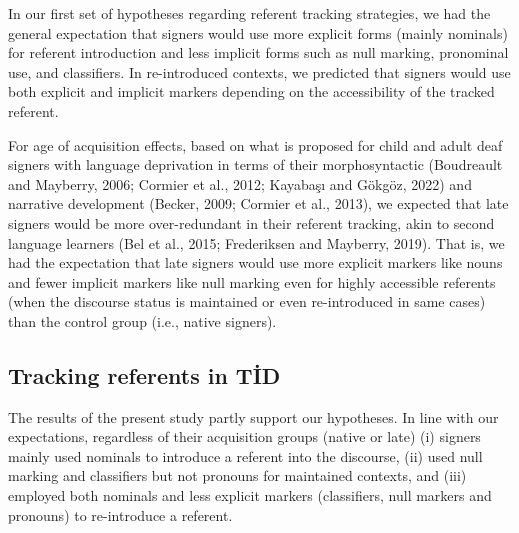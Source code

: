 \documentclass[]{elsarticle} %
\begin{document}
In our first set of hypotheses regarding referent tracking strategies,
we had the general expectation that signers would use more explicit
forms (mainly nominals) for referent introduction and less implicit
forms such as null marking, pronominal use, and classifiers. In
re-introduced contexts, we predicted that signers would use both
explicit and implicit markers depending on the accessibility of the
tracked referent.

For age of acquisition effects, based on what is proposed for child and
adult deaf signers with language deprivation in terms of their
morphosyntactic (Boudreault and Mayberry, 2006; Cormier et al., 2012;
Kayabaşı and Gökgöz, 2022) and narrative development (Becker, 2009;
Cormier et al., 2013), we expected that late signers would be more
over-redundant in their referent tracking, akin to second language
learners (Bel et al., 2015; Frederiksen and Mayberry, 2019). That is, we
had the expectation that late signers would use more explicit markers
like nouns and fewer implicit markers like null marking even for highly
accessible referents (when the discourse status is maintained or even
re-introduced in same cases) than the control group (i.e., native
signers).

\hypertarget{tracking-referents-in-tid}{%
\subsection{Tracking referents in TİD}\label{tracking-referents-in-tid}}

The results of the present study partly support our hypotheses. In line
with our expectations, regardless of their acquisition groups (native or
late) (i) signers mainly used nominals to introduce a referent into the
discourse, (ii) used null marking and classifiers but not pronouns for
maintained contexts, and (iii) employed both nominals and less explicit
markers (classifiers, null markers and pronouns) to re-introduce a
referent.
\end{document}
